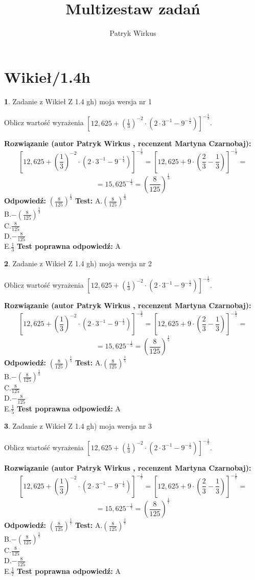 \documentclass[12pt, a4paper]{article}
\title{Multizestaw zadań}
\author{Patryk Wirkus}
\date{}
\theoremstyle{definition} %
\newtheorem{zad}{}
\newcommand{\kategoria}[1]{\section{#1}}
\newcommand{\zadStart}[1]{\begin{zad}#1\newline}
\newcommand{\zadStop}{\end{zad}}
\newcommand{\rozwStart}[2]{\noindent \textbf{Rozwiązanie (autor #1 , recenzent #2): }\newline}
\newcommand{\rozwStop}{\newline}
\newcommand{\odpStart}{\noindent \textbf{Odpowiedź:}\newline}
\newcommand{\odpStop}{\newline}
\newcommand{\testStart}{\noindent \textbf{Test:}\newline}
\newcommand{\testStop}{\newline}
\newcommand{\kluczStart}{\noindent \textbf{Test poprawna odpowiedź:}\newline}
\newcommand{\kluczStop}{\newline}
\begin{document}
\maketitle

\kategoria{Wikieł/1.4h}


\zadStart{Zadanie z Wikieł Z 1.4 gh) moja wersja nr 1}

Oblicz wartość wyrażenia $[12,625+(\frac{1}{3})^{-2}\cdot(2\cdot 3^{-1} - 9^{-\frac{1}{2}})]^{-\frac{1}{3}}$.
\zadStop
\rozwStart{Patryk Wirkus}{Martyna Czarnobaj}
$$[12,625+(\frac{1}{3})^{-2}\cdot(2\cdot 3^{-1} - 9^{-\frac{1}{2}})]^{-\frac{1}{3}} = [12,625+9\cdot (\frac{2}{3}-\frac{1}{3})]^{-\frac{1}{3}} =$$
$$=15,625^{-\frac{1}{3}} = (\frac{8}{125})^\frac{1}{3}$$
\rozwStop
\odpStart
$(\frac{8}{125})^\frac{1}{3}$
\odpStop
\testStart
A.$(\frac{8}{125})^\frac{1}{3}$\\ B.$-(\frac{8}{125})^\frac{1}{3}$\\ C.$\frac{8}{125}$\\ D.$-\frac{8}{125}$\\ E.$\frac{1}{3}$
\testStop
\kluczStart
A
\kluczStop



\zadStart{Zadanie z Wikieł Z 1.4 gh) moja wersja nr 2}

Oblicz wartość wyrażenia $[12,625+(\frac{1}{3})^{-2}\cdot(2\cdot 3^{-1} - 9^{-\frac{1}{2}})]^{-\frac{1}{5}}$.
\zadStop
\rozwStart{Patryk Wirkus}{Martyna Czarnobaj}
$$[12,625+(\frac{1}{3})^{-2}\cdot(2\cdot 3^{-1} - 9^{-\frac{1}{2}})]^{-\frac{1}{5}} = [12,625+9\cdot (\frac{2}{3}-\frac{1}{3})]^{-\frac{1}{5}} =$$
$$=15,625^{-\frac{1}{5}} = (\frac{8}{125})^\frac{1}{5}$$
\rozwStop
\odpStart
$(\frac{8}{125})^\frac{1}{5}$
\odpStop
\testStart
A.$(\frac{8}{125})^\frac{1}{5}$\\ B.$-(\frac{8}{125})^\frac{1}{5}$\\ C.$\frac{8}{125}$\\ D.$-\frac{8}{125}$\\ E.$\frac{1}{5}$
\testStop
\kluczStart
A
\kluczStop



\zadStart{Zadanie z Wikieł Z 1.4 gh) moja wersja nr 3}

Oblicz wartość wyrażenia $[12,625+(\frac{1}{3})^{-2}\cdot(2\cdot 3^{-1} - 9^{-\frac{1}{2}})]^{-\frac{1}{7}}$.
\zadStop
\rozwStart{Patryk Wirkus}{Martyna Czarnobaj}
$$[12,625+(\frac{1}{3})^{-2}\cdot(2\cdot 3^{-1} - 9^{-\frac{1}{2}})]^{-\frac{1}{7}} = [12,625+9\cdot (\frac{2}{3}-\frac{1}{3})]^{-\frac{1}{7}} =$$
$$=15,625^{-\frac{1}{7}} = (\frac{8}{125})^\frac{1}{7}$$
\rozwStop
\odpStart
$(\frac{8}{125})^\frac{1}{7}$
\odpStop
\testStart
A.$(\frac{8}{125})^\frac{1}{7}$\\ B.$-(\frac{8}{125})^\frac{1}{7}$\\ C.$\frac{8}{125}$\\ D.$-\frac{8}{125}$\\ E.$\frac{1}{7}$
\testStop
\kluczStart
A
\kluczStop
\end{document}
